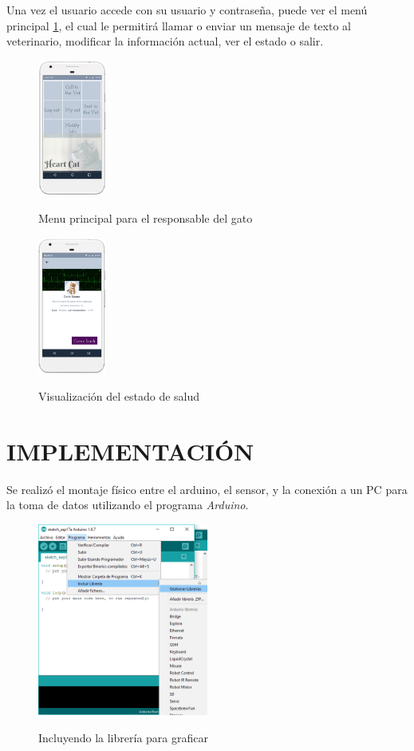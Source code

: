 \documentclass[letterpaper, 10 pt, conference]{ieeeconf}  %
\begin{document}
Una vez el usuario accede con su usuario y contrase\~na, puede ver el men\'u principal \ref{fig:menu}, el cual le permitir\'a llamar o enviar un mensaje de texto al veterinario, modificar la informaci\'on actual, ver el estado o salir.\\

\begin{figure}
\centering
\includegraphics[width=0.2\textwidth]{hc4.PNG}
\label{fig:menu}
\caption{Menu principal para el responsable del gato}
\end{figure}

\begin{figure}
\centering
\includegraphics[width=0.2\textwidth]{HC5.PNG}
\label{fig:viewingHeart}
\caption{Visualizaci\'on del estado de salud}
\end{figure}

\section{IMPLEMENTACI\'ON}

Se realiz\'o el montaje f\'isico entre el arduino, el sensor, y la conexi\'on a un PC para la toma de datos utilizando el programa \textit{Arduino}.

\begin{figure}
\centering
\includegraphics[width=0.5\textwidth]{includeLibrary.png}
\label{fig:library}
\caption{Incluyendo la librer\'ia para graficar}
\end{figure}
\end{document}
